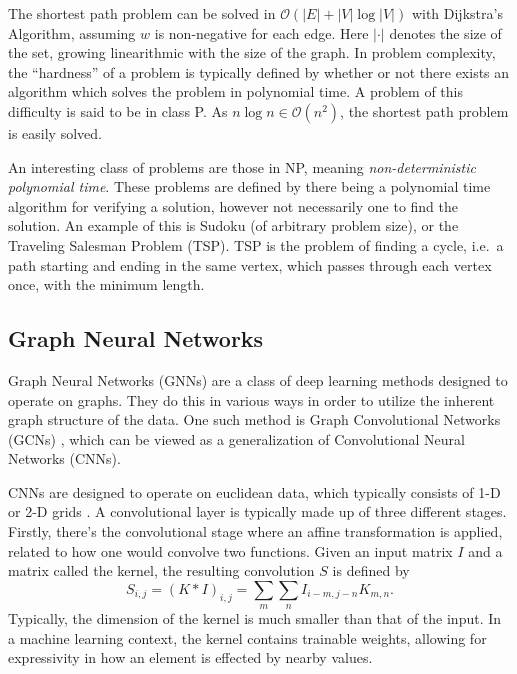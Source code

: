 The shortest path problem can be solved in $\mathcal{O}(|E| + |V| \log|V|)$ with Dijkstra's Algorithm, assuming $w$ is non-negative for each edge.
Here $|\cdot|$ denotes the size of the set, growing linearithmic with the size of the graph.
In problem complexity, the ``hardness'' of a problem is typically defined by whether or not there exists an algorithm which solves the problem in polynomial time.
A problem of this difficulty is said to be in class P.
As $n \log n \in \mathcal{O}(n^2)$, the shortest path problem is easily solved.

An interesting class of problems are those in NP, meaning \textit{non-deterministic polynomial time}.
These problems are defined by there being a polynomial time algorithm for verifying a solution, however not necessarily one to find the solution.
An example of this is Sudoku (of arbitrary problem size), or the Traveling Salesman Problem (TSP).
TSP is the problem of finding a cycle, i.e.\ a path starting and ending in the same vertex, which passes through each vertex once, with the minimum length.

\subsection{Graph Neural Networks}
Graph Neural Networks (GNNs) are a class of deep learning methods designed to operate on graphs.
They do this in various ways in order to utilize the inherent graph structure of the data.
One such method is Graph Convolutional Networks (GCNs) \cite{kipf2017semisupervised}, which can be viewed as a generalization of Convolutional Neural Networks (CNNs).

CNNs are designed to operate on euclidean data, which typically consists of 1-D or 2-D grids \cite[p.~326--339]{Goodfellow-et-al-2016}.
A convolutional layer is typically made up of three different stages.
Firstly, there's the convolutional stage where an affine transformation is applied, related to how one would convolve two functions.
Given an input matrix $I$ and a matrix called the kernel, the resulting convolution $S$ is defined by
\begin{equation}
    S_{i,j} = (K * I)_{i,j} = \sum_m \sum_n I_{i - m, j - n} K_{m, n}.
\end{equation}
Typically, the dimension of the kernel is much smaller than that of the input.
In a machine learning context, the kernel contains trainable weights, allowing for expressivity in how an element is effected by nearby values.

